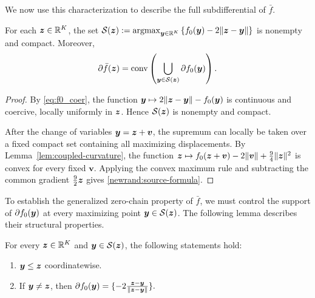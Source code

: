 We now use this characterization to describe the
full subdifferential of $\bar f$. 
\begin{lemma}
\label{newrand:sources}
For each $\bm{z}\in{\mathbb{R}}^K$, the set
$\mathcal S(\bm{z})
 :=
 \operatorname*{argmax}_{\bm{y}\in{\mathbb{R}}^K}
 \left\{f_0(\bm{y})-2\|\bm{z}-\bm{y}\|\right\}
$ is nonempty and compact. Moreover,
\begin{equation}
\label{newrand:source-formula}
 \partial \bar f(\bm{z})
 =
 \operatorname{conv}
 \left(
 \bigcup_{\bm{y}\in\mathcal S(\bm{z})}
 \partial f_0(\bm{y})
 \right).
\end{equation}
\end{lemma}
\begin{proof}
By \eqref{eq:f0_coer}, the function
$\bm{y}\mapsto 2\|\bm{z}-\bm{y}\|-f_0(\bm{y})$ is continuous
and coercive, locally uniformly in $\bm{z}$.
Hence $\mathcal S(\bm{z})$ is nonempty and compact.

After the change of variables $\bm{y}=\bm{z}+\bm v$,
the supremum can locally be taken over a fixed
compact set containing all maximizing displacements.
By Lemma~\ref{lem:coupled-curvature}, the function
$
 \bm{z}\mapsto
 f_0(\bm{z}+\bm v)-2\|\bm v\|
 +\frac94\|\bm{z}\|^2
$
is convex for every fixed $\bm v$.
Applying the convex maximum rule and subtracting
the common gradient $\tfrac92\bm{z}$ gives
\eqref{newrand:source-formula}.
\end{proof}

To establish the generalized zero-chain property of $\bar f$,
we must control the support of $\partial f_0(\bm{y})$
at every maximizing point $\bm{y}\in\mathcal S(\bm{z})$.
The following lemma describes their structural properties.

\begin{lemma}
\label{lem:source-order}
For every $\bm{z}\in{\mathbb{R}}^K$ and  $\bm{y}\in\mathcal S(\bm{z})$,
the following statements hold:
\begin{enumerate}
\renewcommand{\labelenumi}{(\roman{enumi})}
 \item $\bm{y}\le\bm{z}$ coordinatewise.
 \item If $\bm{y}\ne\bm{z}$, then
 $
  \partial f_0(\bm{y})
  =
\{
  -2\tfrac{\bm{z}-\bm{y}}{\|\bm{z}-\bm{y}\|}
  \}.
$
\end{enumerate}
\end{lemma}

